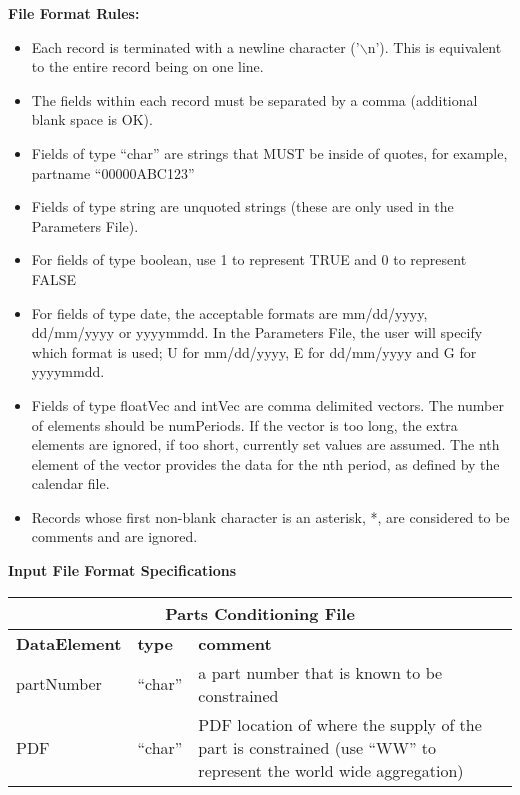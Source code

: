 \noindent
{\bf File Format Rules:}
\begin{itemize}
\item Each record is terminated with a newline character ('$\backslash$n').  This is
  equivalent to the entire record being on one line.
\item The fields within each record must be separated by a comma (additional
  blank space is OK).
\item Fields of type ``char'' are strings that MUST be inside of quotes, for example,
  partname ``00000ABC123''
\item Fields of type string are unquoted strings (these are only used
  in the Parameters File).
\item For fields of type boolean, use 1 to represent TRUE and 0 to
  represent FALSE
\item For fields of type date, the acceptable formats are mm/dd/yyyy, 
  dd/mm/yyyy or yyyymmdd.  In the Parameters File, the user will specify which
  format is used;  U for mm/dd/yyyy, E for dd/mm/yyyy and G for yyyymmdd.
\item Fields of type floatVec and intVec are comma delimited vectors.
  The number of elements should be numPeriods.  If the vector is too
  long, the extra elements are ignored, if too short,  currently set
  values are assumed.  The nth element of the vector provides the
  data for the nth period, as defined by the calendar file.
\item Records whose first non-blank character is an asterisk, *, are 
  considered to be comments and are ignored.
 
\end{itemize}

\clearpage
\noindent
{\bf Input File Format Specifications}

\vspace{.5in}

\begin{tabular}{llp{4in}}
\multicolumn{3}{c}{{\bf Parts Conditioning File}}\\ \hline\hline
{\bf DataElement} &  {\bf type}  &   {\bf comment} \\ \hline
partNumber &  ``char'' & a part number that is known to be constrained \\
PDF     &     ``char'' &   PDF location of where the supply of the part is constrained
                       (use ``WW'' to represent the world wide aggregation)
\end{tabular}
 
\vspace{.5in}

